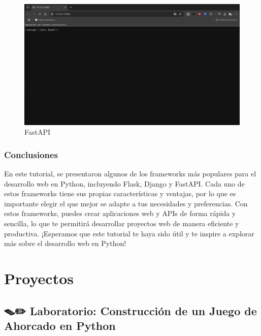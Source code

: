 \documentclass[
  a4paper,
  DIV=11,
  numbers=noendperiod,
  onepage,
  openany]{scrreprt}
\begin{document}
\begin{figure}[H]

{\centering \includegraphics[width=8.33333in,height=\textheight,keepaspectratio]{unidades/unidad7/./images/fastapi_code002.png}

}

\caption{FastAPI}

\end{figure}%

\section{Conclusiones}\label{conclusiones-12}

En este tutorial, se presentaron algunos de los frameworks más populares
para el desarrollo web en Python, incluyendo Flask, Django y FastAPI.
Cada uno de estos frameworks tiene sus propias características y
ventajas, por lo que es importante elegir el que mejor se adapte a tus
necesidades y preferencias. Con estos frameworks, puedes crear
aplicaciones web y APIs de forma rápida y sencilla, lo que te permitirá
desarrollar proyectos web de manera eficiente y productiva. ¡Esperamos
que este tutorial te haya sido útil y te inspire a explorar más sobre el
desarrollo web en Python!

\part{Proyectos}

\chapter{🪤✏️ Laboratorio: Construcción de un Juego de Ahorcado en
Python}\label{laboratorio-construcciuxf3n-de-un-juego-de-ahorcado-en-python}
\end{document}
